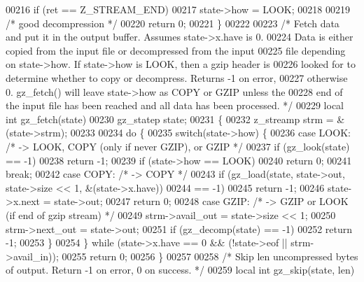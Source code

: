 \begin{DoxyCode}
00216     \textcolor{keywordflow}{if} (ret == Z\_STREAM\_END)
00217         state->how = LOOK;
00218 
00219     \textcolor{comment}{/* good decompression */}
00220     \textcolor{keywordflow}{return} 0;
00221 \}
00222 
00223 \textcolor{comment}{/* Fetch data and put it in the output buffer.  Assumes state->x.have is 0.}
00224 \textcolor{comment}{   Data is either copied from the input file or decompressed from the input}
00225 \textcolor{comment}{   file depending on state->how.  If state->how is LOOK, then a gzip header is}
00226 \textcolor{comment}{   looked for to determine whether to copy or decompress.  Returns -1 on error,}
00227 \textcolor{comment}{   otherwise 0.  gz\_fetch() will leave state->how as COPY or GZIP unless the}
00228 \textcolor{comment}{   end of the input file has been reached and all data has been processed.  */}
00229 local \textcolor{keywordtype}{int} gz\_fetch(state)
00230     gz\_statep state;
00231 \{
00232     z\_streamp strm = &(state->strm);
00233 
00234     \textcolor{keywordflow}{do} \{
00235         \textcolor{keywordflow}{switch}(state->how) \{
00236         \textcolor{keywordflow}{case} LOOK:      \textcolor{comment}{/* -> LOOK, COPY (only if never GZIP), or GZIP */}
00237             \textcolor{keywordflow}{if} (gz\_look(state) == -1)
00238                 \textcolor{keywordflow}{return} -1;
00239             \textcolor{keywordflow}{if} (state->how == LOOK)
00240                 \textcolor{keywordflow}{return} 0;
00241             \textcolor{keywordflow}{break};
00242         \textcolor{keywordflow}{case} COPY:      \textcolor{comment}{/* -> COPY */}
00243             \textcolor{keywordflow}{if} (gz\_load(state, state->out, state->size << 1, &(state->x.have))
00244                     == -1)
00245                 \textcolor{keywordflow}{return} -1;
00246             state->x.next = state->out;
00247             \textcolor{keywordflow}{return} 0;
00248         \textcolor{keywordflow}{case} GZIP:      \textcolor{comment}{/* -> GZIP or LOOK (if end of gzip stream) */}
00249             strm->avail\_out = state->size << 1;
00250             strm->next\_out = state->out;
00251             \textcolor{keywordflow}{if} (gz\_decomp(state) == -1)
00252                 \textcolor{keywordflow}{return} -1;
00253         \}
00254     \} \textcolor{keywordflow}{while} (state->x.have == 0 && (!state->eof || strm->avail\_in));
00255     \textcolor{keywordflow}{return} 0;
00256 \}
00257 
00258 \textcolor{comment}{/* Skip len uncompressed bytes of output.  Return -1 on error, 0 on success. */}
00259 local \textcolor{keywordtype}{int} gz\_skip(state, len)

\end{DoxyCode}
